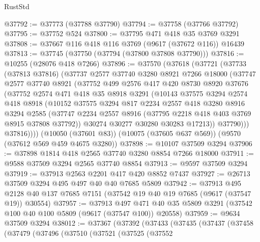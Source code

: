 \begin{lexlean}{RustStd}
\begin{coremodule}
@37792 := @37773 (@37788 @37790)
@37794 := @37758 (@37766 @37792)
@37795 := @37752 @524
@37800 := @37795 @471 @418 @35 @3769 @3291
@37808 := @37667 @116 @418 @116 @3769 (@9617 (@37672 @116)) @16439
@37813 := @37745 (@37750 (@37794 (@37800 @37808 @37790)))
@37816 := @10255 (@28076 @418 @7266)
@37896 := @37570
    (@37618
      (@37721
        (@37733
          (@37813 @37816)
          (@37737
            @2577
            @37740
            @3280
            @8921
            @7266
            @18000
            (@37747
              @2577
              @37740
              @8921
              (@37752
                @499
                @2576
                @417
                @420
                @8730
                @8920
                @37676
                (@37752
                  @2574
                  @471
                  @418
                  @35
                  @8918
                  @3291
                  (@10143
                    @37575
                    @3294
                    @2574
                    @418
                    @8918
                    (@10152
                      @37575
                      @3294
                      @817
                      @2234
                      @2557
                      @418
                      @3280
                      @8916
                      @3294
                      @2585
                      (@37747 @2234 @2557 @8916 (@37795 @2218 @418 @403 @3769 @8915 @37808 @37792))
                      @30274
                      @30277
                      @30280
                      @30283
                      @17213))
                  @37790)))
            @37816))))
    (@10050 (@37601 @83))
    (@10075 (@37605 @637 @569))
    (@9570 (@37612 @569 @459 @4675 @3280))
@37898 := @10107 @37509 @3294
@37906 := @37898 @1814 @418 @2565 @37740 @3280 @8854 @7266 @18000
@37911 := @9588 @37509 @3294 @2565 @37740 @8854
@37913 := @9597 @37509 @3294
@37919 := @37913 @2563 @2201 @417 @420 @8852 @7437
@37927 := @26713 @37509 @3294 @495 @497 @40 @40 @7685 @5809
@37942 := @37913
    @495
    @2128
    @40
    @137
    @7685
    @7151
    (@37542 @19 @40 @19 @7685 (@9617 (@37547 @19)) @30554)
@37957 := @37913
    @497
    @471
    @40
    @35
    @5809
    @3291
    (@37542 @100 @40 @100 @5809 (@9617 (@37547 @100)) @20558)
@37959 := @9634 @37509 @3294
@38012 := @37367
    (@37392
      (@37433
        (@37435
          (@37437
            (@37458
              (@37479
                (@37496
                  (@37510
                    (@37521
                      (@37525
                        (@37552

\end{coremodule}
\end{lexlean}
